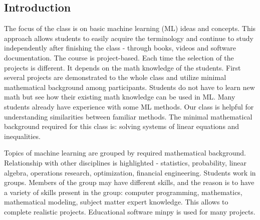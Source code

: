 
\subsection{Introduction \label{introduction}}

The focus of the class is on basic machine learning (ML) ideas and concepts. This approach allows students to easily acquire the terminology and continue to study independently after finishing the class -  through books, videos  and software documentation.  The course is project-based. Each time the selection of the projects is different. It depends on the math knowledge of the students. First several projects are demonstrated to the whole class and utilize minimal mathematical background among participants. Students do not have to learn new math but see how their existing math knowledge can be used in ML.   Many students already have experience with some ML methods. Our class is helpful for understanding similarities between familiar methods.  The minimal mathematical background required for this class is: solving systems of linear equations and inequalities.

 Topics of machine learning are grouped by required mathematical background. Relationship with other disciplines is highlighted - statistics, probability, linear algebra, operations research, optimization, financial engineering. Students work in groups.  Members of the group may have different skills, and the reason is to have a variety of skills present in the group: computer programming, mathematics, mathematical modeling, subject matter expert knowledge. This allows to complete realistic projects. Educational software minpy is used for many projects.

